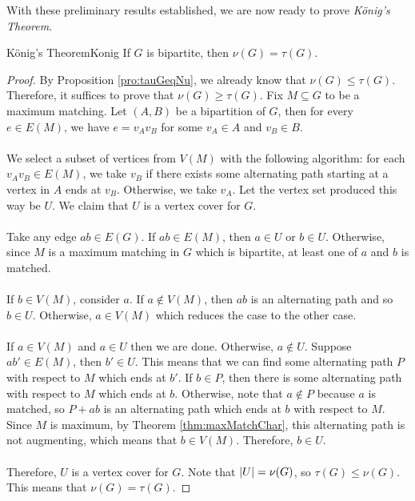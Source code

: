 \documentclass[math, code]{amznotes}
\theoremstyle{remark}
\begin{document}
With these preliminary results established, we are now ready to prove \textit{K\"{o}nig's Theorem}.
\begin{thmbox}{K\"{o}nig's Theorem}{Konig}
    If $G$ is bipartite, then $\nu(G) = \tau(G)$.
    \tcblower
    \begin{proof}
        By Proposition \ref{pro:tauGeqNu}, we already know that $\nu(G) \leq \tau(G)$. Therefore, it suffices to prove that $\nu(G) \geq \tau(G)$. Fix $M \subseteq G$ to be a maximum matching. Let $(A, B)$ be a bipartition of $G$, then for every $e \in E(M)$, we have $e = v_Av_B$ for some $v_A \in A$ and $v_B \in B$.
        \\\\
        We select a subset of vertices from $V(M)$ with the following algorithm: for each $v_Av_B \in E(M)$, we take $v_B$ if there exists some alternating path starting at a vertex in $A$ ends at $v_B$. Otherwise, we take $v_A$. Let the vertex set produced this way be $U$. We claim that $U$ is a vertex cover for $G$.
        \\\\
        Take any edge $ab \in E(G)$. If $ab \in E(M)$, then $a \in U$ or $b \in U$. Otherwise, since $M$ is a maximum matching in $G$ which is bipartite, at least one of $a$ and $b$ is matched.
        \\\\
        If $b \in V(M)$, consider $a$. If $a \notin V(M)$, then $ab$ is an alternating path and so $b \in U$. Otherwise, $a \in V(M)$ which reduces the case to the other case.
        \\\\
        If $a \in V(M)$ and $a \in U$ then we are done. Otherwise, $a \notin U$. Suppose $ab' \in E(M)$, then $b' \in U$. This means that we can find some alternating path $P$ with respect to $M$ which ends at $b'$. If $b \in P$, then there is some alternating path with respect to $M$ which ends at $b$. Otherwise, note that $a \notin P$ because $a$ is matched, so $P + ab$ is an alternating path which ends at $b$ with respect to $M$. Since $M$ is maximum, by Theorem \ref{thm:maxMatchChar}, this alternating path is not augmenting, which means that $b \in V(M)$. Therefore, $b \in U$. 
        \\\\
        Therefore, $U$ is a vertex cover for $G$. Note that ${\left\lvert {U} \right\rvert} = \nu(G)$, so $\tau(G) \leq \nu(G)$. This means that $\nu(G) = \tau(G)$.
    \end{proof}
\end{thmbox}
\end{document}
